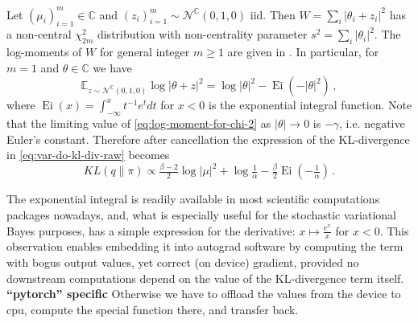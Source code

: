 \documentclass[a4paper,10pt]{article}
\newcommand{\important}[1]{\textbf{\color{red} #1}}
\newcommand{\cplx}{\mathbb{C}}
\begin{document}
Let $(\mu_i)_{i=1}^m \in \cplx$ and $
  (z_i)_{i=1}^m \sim \mathcal{N}^{\cplx}(0, 1, 0)
$ iid. Then $W = \sum_i \lvert \theta_i + z_i \rvert^2$ has a non-central $\chi^2_{2m}$
distribution with non-centrality parameter $s^2 = \sum_i \lvert \theta_i \rvert^2$. The
log-moments of $W$ for general integer $m \geq1$ are given in
\cite[p.~2466]{lapidoth_capacity_2003}.  %
In particular, for $m=1$ and $\theta\in \cplx$ we have
\begin{equation}  \label{eq:log-moment-for-chi-2}
\mathbb{E}_{z \sim \mathcal{N}^{\cplx}(0, 1, 0)}
  \log \lvert \theta + z \rvert^2
  = \log \lvert \theta \rvert^2 - \mathop{Ei}( - \lvert \theta \rvert^2)
  \,,
\end{equation}
where $\mathop{Ei}(x) = \int^x_{-\infty} t^{-1} e^t dt$ for $x < 0$ is the exponential integral
function. Note that the limiting value of \eqref{eq:log-moment-for-chi-2} as $
  \lvert \theta \rvert \to 0
$ is $- \gamma$, i.e. negative Euler's constant. Therefore after cancellation the expression
of the KL-divergence in \eqref{eq:var-do-kl-div-raw} becomes
\begin{equation}  \label{eq:var-do-kl-div}
KL(q\| \pi)
  \propto
    \tfrac{\beta-2}2 \log{\lvert \mu \rvert^2}
    + \log{\tfrac1{\alpha}}
    - \tfrac{\beta}2 \mathop{Ei}(- \tfrac1{\alpha})
  \,.
\end{equation}

The exponential integral is readily available in most scientific computations packages nowadays,
and, what is especially useful for the stochastic variational Bayes purposes, has a simple
expression for the derivative: $x \mapsto \tfrac{e^x}{x}$ for $x < 0$. This observation enables
embedding it into autograd software by computing the term with bogus output values, yet correct
(on device) gradient, provided no downstream computations depend on the value of the KL-divergence
term itself.
%
\important{``pytorch'' specific}
Otherwise we have to offload the values from the device to cpu, compute the special
function there, and transfer back.
\end{document}
